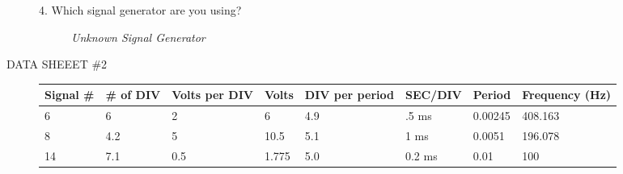 \documentclass{article}
\begin{document}
\begin{description}
\begin{description}
\item[4. Which signal generator are you using?] {\it{Unknown Signal Generator}}
\end{description}
\item[DATA SHEEET \#2] \hfill
\begin{samepage}
{\small{
\begin{center}
	\begin{tabular}{| l | l | l | l | l | l | l | l |}
		\hline
		Signal \# &  \# of DIV & Volts per DIV & Volts & DIV per period & SEC/DIV & Period & Frequency (Hz)\\ \hline
		6 & 6 & 2 & 6 & 4.9 & .5 ms & 0.00245 & 408.163 \\ \hline
		8 & 4.2 & 5 & 10.5 & 5.1 & 1 ms & 0.0051 & 196.078 \\ \hline
		14 & 7.1 & 0.5  & 1.775 & 5.0 & 0.2 ms & 0.01 & 100 \\
		\hline
	\end{tabular}
\end{center}
}}
\end{samepage}
\end{description}
\end{document}
